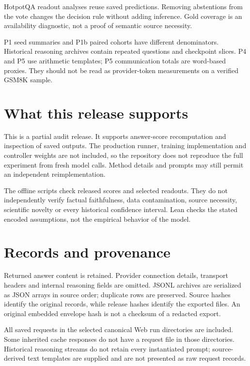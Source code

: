 \documentclass[11pt]{article}
\begin{document}
HotpotQA readout analyses reuse saved predictions. Removing abstentions from the vote changes the decision rule without adding inference. Gold coverage is an availability diagnostic, not a proof of semantic source necessity.

P1 seed summaries and P1b paired cohorts have different denominators. Historical reasoning archives contain repeated questions and checkpoint slices. P4 and P5 use arithmetic templates; P5 communication totals are word-based proxies. They should not be read as provider-token measurements on a verified GSM8K sample.

\section*{What this release supports}

This is a partial audit release. It supports answer-score recomputation and inspection of saved outputs. The production runner, training implementation and controller weights are not included, so the repository does not reproduce the full experiment from fresh model calls. Method details and prompts may still permit an independent reimplementation.

The offline scripts check released scores and selected readouts. They do not independently verify factual faithfulness, data contamination, source necessity, scientific novelty or every historical confidence interval. Lean checks the stated encoded assumptions, not the empirical behavior of the model.

\section*{Records and provenance}

Returned answer content is retained. Provider connection details, transport headers and internal reasoning fields are omitted. JSONL archives are serialized as JSON arrays in source order; duplicate rows are preserved. Source hashes identify the original records, while release hashes identify the exported files. An original embedded envelope hash is not a checksum of a redacted export.

All saved requests in the selected canonical Web run directories are included. Some inherited cache responses do not have a request file in those directories. Historical reasoning streams do not retain every instantiated prompt; source-derived text templates are supplied and are not presented as raw request records.
\end{document}
